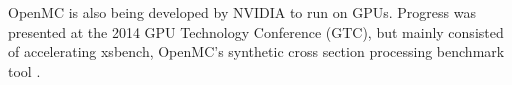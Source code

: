 OpenMC \cite{openmc} %
 is also being developed by NVIDIA to run on GPUs.  Progress was presented at the 2014 GPU Technology Conference (GTC), but mainly consisted of accelerating xsbench, OpenMC's synthetic cross section processing benchmark tool \cite{scudiero,openmc}.
